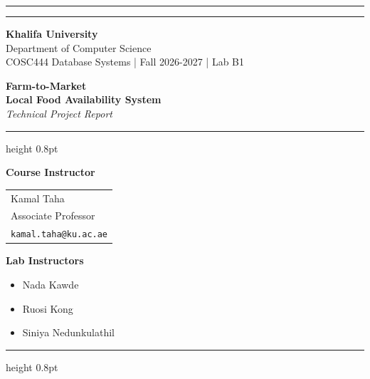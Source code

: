 \documentclass[12pt,a4paper]{report}
\begin{document}
\hypersetup{pageanchor=false}
\begin{titlepage}
\thispagestyle{empty}
{\color{kuBlue}\rule{\linewidth}{4pt}}\vspace{6pt}
{\color{kuGold}\rule{\linewidth}{1.5pt}}
\vspace{0.4cm}
\begin{center}
{\large\bfseries\color{kuBlue}Khalifa University}\\[4pt]
{\normalsize\color{gray}Department of Computer Science}\\[2pt]
{\normalsize\color{gray}COSC444 Database Systems  |  Fall 2026-2027  |  Lab B1}
\end{center}
\vspace{0.8cm}
\begin{center}
{\Huge\bfseries\color{kuBlue}Farm-to-Market}\\[10pt]
{\Large\color{kuGold}\bfseries Local Food Availability System}\\[10pt]
{\normalsize\color{gray}\itshape Technical Project Report}
\end{center}
\vspace{0.6cm}\hrule height 0.8pt\vspace{0.8cm}
\begin{minipage}[t]{0.48\linewidth}\centering
{\bfseries\color{kuBlue}Course Instructor}\\[6pt]
\begin{tabular}{@{}l@{}}Kamal Taha\\Associate Professor\\\texttt{kamal.taha@ku.ac.ae}\end{tabular}
\end{minipage}\hfill
\begin{minipage}[t]{0.48\linewidth}\centering
{\bfseries\color{kuBlue}Lab Instructors}\\[6pt]
\begin{minipage}{0.94\linewidth}
\begin{itemize}[leftmargin=1.2em,itemsep=3pt,topsep=0pt]
\item Nada Kawde
\item Ruosi Kong
\item Siniya Nedunkulathil
\end{itemize}
\end{minipage}
\end{minipage}
\vspace{0.8cm}\hrule height 0.8pt\vspace{0.6cm}
\begin{center}

\end{center}
\end{titlepage}
\end{document}
